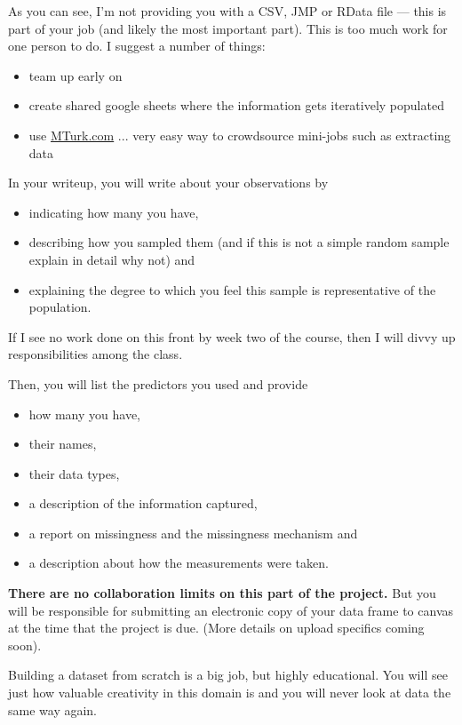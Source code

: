 \documentclass[12pt]{article}
\begin{document}
As you can see, I'm not providing you with a CSV, JMP or RData file --- this is part of your job (and likely the most important part). This is too much work for one person to do. I suggest a number of things:

\begin{itemize}
\item team up early on
\item create shared google sheets where the information gets iteratively populated
\item use \url{MTurk.com} ... very easy way to crowdsource mini-jobs such as extracting data
\end{itemize}

In your writeup, you will write about your observations by

\begin{itemize}
\item indicating how many you have,
\item describing how you sampled them (and if this is not a simple random sample explain in detail why not) and
\item explaining the degree to which you feel this sample is representative of the population.
\end{itemize}

\noindent If I see no work done on this front by week two of the course, then I will divvy up responsibilities among the class.

\noindent Then, you will list the predictors you used and provide

\begin{itemize}
\item how many you have,
\item their names,
\item their data types,
\item a description of the information captured,
\item a report on missingness and the missingness mechanism and
\item a description about how the measurements were taken.
\end{itemize}


\textbf{There are no collaboration limits on this part of the project.} But you will be responsible for submitting an electronic copy of your data frame to canvas at the time that the project is due. (More details on upload specifics coming soon).

Building a dataset from scratch is a big job, but highly educational. You will see just how valuable creativity in this domain is and you will never look at data the same way again.
\end{document}

